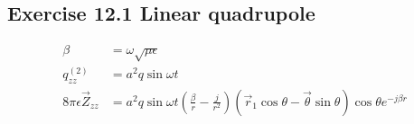 \documentclass[../main.tex]{subfiles}
\begin{document}
\subsection{Exercise 12.1 Linear quadrupole}
\begin{align}
    \beta&=\omega\sqrt{\mu\epsilon}\\
    q_{zz}^{(2)}&=a^2q\sin\omega t\\
    8\pi\epsilon\vec{Z}_{zz}&=a^2q\sin\omega t\left(\frac{\beta}{r}-\frac{j}{r^2}\right)(\vec{r}_1\cos\theta-\vec{\theta}\sin\theta)\cos\theta e^{-j\beta r}\\
\end{align}
\end{document}
